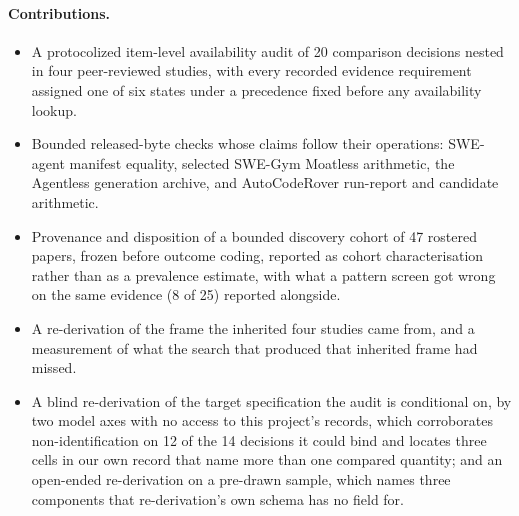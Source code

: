 \paragraph{Contributions.}
\begin{itemize}
  \item A protocolized item-level availability audit of 20 comparison decisions nested in
        four peer-reviewed studies, with every recorded evidence requirement assigned one of
        six states under a precedence fixed before any availability lookup.
  \item Bounded released-byte checks whose claims follow their operations: SWE-agent manifest
        equality, selected SWE-Gym Moatless arithmetic, the Agentless generation archive, and
        AutoCodeRover run-report and candidate arithmetic.
  \item Provenance and disposition of a bounded discovery cohort of 47 rostered papers,
        frozen before outcome coding, reported as cohort characterisation rather than as a
        prevalence estimate, with what a pattern screen got wrong on the same evidence
        (8 of 25) reported alongside.
  \item A re-derivation of the frame the inherited four studies came from, and a measurement
        of what the search that produced that inherited frame had missed.
  \item A blind re-derivation of the target specification the audit is conditional on, by two
        model axes with no access to this project's records, which corroborates
        non-identification on 12 of the 14 decisions it could bind and locates three cells in
        our own record that name more than one compared quantity; and an open-ended
        re-derivation on a pre-drawn sample, which names three components that
        re-derivation's own schema has no field for.
\end{itemize}

